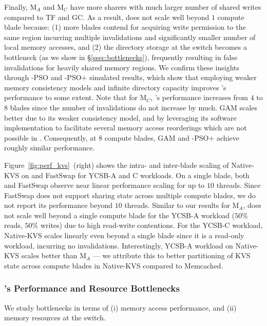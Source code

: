 Finally, M$_A$ and M$_C$ have more sharers with much larger number of shared writes compared to TF and GC. As a result, \mind does not scale well beyond $1$ compute blade because: (1) more blades contend for acquiring write permission to the same region incurring multiple invalidations and significantly smaller number of local memory accesses, and (2) the directory storage at the switch becomes a bottleneck (as we show in \S\ref{ssec:bottlenecks}), frequently resulting in false invalidations for heavily shared memory regions. We confirm these insights through \mind-PSO and \mind-PSO$+$ simulated results, which show that employing weaker memory consistency models and infinite directory capacity improves \mind's performance to some extent. Note that for M$_C$, \mind's performance increases from $4$ to $8$ blades since the number of invalidations do not increase by much. GAM scales better due to its weaker consistency model, and by leveraging its software implementation to facilitate several memory access reorderings which are not possible in \mind. Consequently, at $8$ compute blades, GAM and \mind-PSO$+$ achieve roughly similar performance.

 Figure~\ref{fig:perf_kvs}~(right) shows the intra- and inter-blade scaling of Native-KVS on \mind and FastSwap for YCSB-A and C workloads. On a single blade, both \mind and FastSwap observe near linear performance scaling for up to $10$ threads. Since FastSwap does not support sharing state across multiple compute blades, we do not report its performance beyond $10$ threads. Similar to our results for M$_A$, \mind does not scale well beyond a single compute blade for the YCSB-A workload ($50\%$ reads, $50\%$ writes) due to high read-write contentions. For the YCSB-C workload, Native-KVS scales linearly even beyond a single blade since it is a read-only workload, incurring no invalidations. Interestingly, YCSB-A workload on Native-KVS scales better than M$_A$ --- we attribute this to better partitioning of KVS state across compute blades in Native-KVS compared to Memcached.

\subsubsection{\mind's Performance and Resource Bottlenecks}
\label{sssec:bottlenecks}

We study \mind bottlenecks in terms of (i) memory access performance, and (ii) memory resources at the switch.

